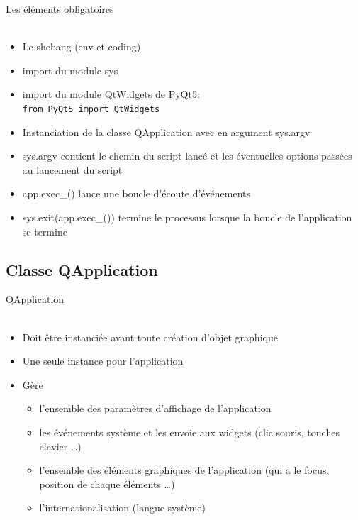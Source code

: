 \documentclass[9pt, french, brown]{beamer}
\newcommand{\mytitle}[1]{{\color{brown}#1 \\~\\}}
\begin{document}
\begin{frame}[fragile]{\secname}{\subsecname}
\mytitle{Les éléments obligatoires}
\begin{itemize}
\item Le shebang (env et coding)
\item import du module sys
\item import du module QtWidgets de PyQt5: \\
\verb|from PyQt5 import QtWidgets|
\item Instanciation de la classe QApplication avec en argument sys.argv
\item sys.argv contient le chemin du script lancé et les éventuelles options passées au lancement du script
\item app.exec\_() lance une boucle d\rq{}écoute d\rq{}événements
\item sys.exit(app.exec\_()) termine le processus lorsque la boucle de l\rq{}application se termine
\end{itemize}
\end{frame}

\subsection{Classe QApplication} 
\begin{frame}{\secname}{\subsecname}
\mytitle{QApplication}
\begin{itemize}
\item Doit être instanciée avant toute création d\rq{}objet graphique
\item Une seule instance pour l\rq{}application
\item Gère
\begin{itemize}
	\item l\rq{}ensemble des paramètres d\rq{}affichage de l\rq{}application
	\item les événements système et les envoie aux widgets (clic souris, touches clavier \dots)
	\item l\rq{}ensemble des éléments graphiques de l\rq{}application (qui a le focus, position de chaque éléments \ldots)
	\item l\rq{}internationalisation (langue système)
\end{itemize}
\end{itemize}
\end{frame}

\end{document}
